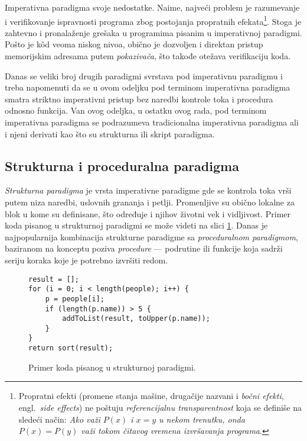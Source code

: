 Imperativna paradigma svoje nedostatke. Naime, najveći problem je razumevanje i verifikovanje ispravnosti programa zbog postojanja propratnih efekata\footnote{Propratni efekti (promene stanja mašine, drugačije nazvani i \emph{bočni efekti}, engl.~\emph{side effects}) ne poštuju \emph{referencijalnu transparentnost} koja se definiše na sledeći način: \emph{Ako važi $P(x)$ i $x = y$ u nekom trenutku, onda $P(x) = P(y)$ važi tokom čitavog vremena izvršavanja programa}.}. Stoga je zahtevno i pronalaženje grešaka u programima pisanim u imperativnoj paradigmi. Pošto je k\^od veoma niskog nivoa, obično je dozvoljen i direktan pristup memorijskim adresama putem \emph{pokazivača}, što takođe otežava verifikaciju koda.

Danas se veliki broj drugih paradigmi svrstava pod imperativnu paradigmu i treba napomenuti da se u ovom odeljku pod terminom imperativna paradigma smatra striktno imperativni pristup bez naredbi kontrole toka i procedura odnosno funkcija. Van ovog odeljka, u ostatku ovog rada, pod terminom imperativna paradigma se podrazumeva tradicionalna imperativna paradigma ali i njeni derivati kao što su strukturna ili skript paradigma.


\subsection{Strukturna i proceduralna paradigma}
\label{subsec:ParadigmImperativeStructural}

\emph{Strukturna paradigma} je vrsta imperativne paradigme gde se kontrola toka vrši putem niza naredbi, uslovnih grananja i petlji. Promenljive su obično lokalne za blok u kome su definisane, što određuje i njihov životni vek i vidljivost. Primer koda pisanog u strukturnoj paradigmi se može videti na slici \ref{fig:ParadigmStructural}. Danas je najpopularnija kombinacija strukturne paradigme sa \emph{proceduralnom paradigmom}, baziranom na konceptu poziva \emph{procedure} --- podrutine ili funkcije koja sadrži seriju koraka koje je potrebno izvršiti redom.

\begin{figure}[h!]
\begin{lstlisting}
result = [];
for (i = 0; i < length(people); i++) {
    p = people[i];
    if (length(p.name)) > 5 {
        addToList(result, toUpper(p.name));
    }
}
return sort(result);
\end{lstlisting}
\caption{Primer koda pisanog u strukturnoj paradigmi.}
\label{fig:ParadigmStructural}
\end{figure}


